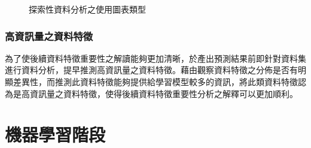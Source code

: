 \begin{figure}[!htb]
  \centering
  \caption[探索性資料分析之使用圖表類型]{探索性資料分析之使用圖表類型}
  \label{fig:Image_EDADiagrams}
\end{figure}

\subsubsection{高資訊量之資料特徵}
\label{subsubsec:ValuableFeatures}

為了使後續資料特徵重要性之解讀能夠更加清晰，於產出預測結果前即針對資料集進行資料分析，提早推測高資訊量之資料特徵。藉由觀察資料特徵之分佈是否有明顯差異性，而推測此資料特徵能夠提供給學習模型較多的資訊，將此類資料特徵認為是高資訊量之資料特徵，使得後續資料特徵重要性分析之解釋可以更加順利。



\section{機器學習階段}

